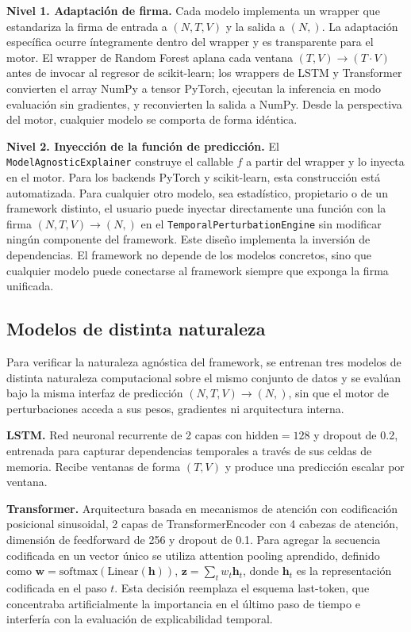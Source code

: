 \documentclass[conference, letterpaper]{IEEEtran}
\begin{document}
\textbf{Nivel 1. Adaptación de firma.} Cada modelo implementa
un wrapper que estandariza la firma de entrada a $(N, T, V)$ y
la salida a $(N,)$. La adaptación específica ocurre íntegramente
dentro del wrapper y es transparente para el motor. El wrapper de
Random Forest aplana cada ventana $(T, V) \rightarrow (T \cdot V)$
antes de invocar al regresor de scikit-learn; los wrappers de LSTM
y Transformer convierten el array NumPy a tensor PyTorch, ejecutan
la inferencia en modo evaluación sin gradientes, y reconvierten la
salida a NumPy. Desde la perspectiva del motor, cualquier modelo
se comporta de forma idéntica.

\textbf{Nivel 2. Inyección de la función de predicción.} El
\texttt{ModelAgnosticExplainer} construye el callable $f$ a partir
del wrapper y lo inyecta en el motor. Para los backends PyTorch y
scikit-learn, esta construcción está automatizada. Para cualquier
otro modelo, sea estadístico, propietario o de un framework distinto,
el usuario puede inyectar directamente una función con la firma
$(N, T, V) \rightarrow (N,)$ en el \texttt{TemporalPerturbationEngine}
sin modificar ningún componente del framework. Este diseño implementa
la inversión de dependencias. El framework no depende de los modelos
concretos, sino que cualquier modelo puede conectarse al framework
siempre que exponga la firma unificada.


\subsection{Modelos de distinta naturaleza}
\label{sec:modelos_naturaleza}

Para verificar la naturaleza agnóstica del framework, se
entrenan tres modelos de distinta naturaleza computacional
sobre el mismo conjunto de datos y se evalúan bajo la misma
interfaz de predicción $(N, T, V) \rightarrow (N,)$, sin que
el motor de perturbaciones acceda a sus pesos, gradientes ni
arquitectura interna.

\textbf{LSTM.} Red neuronal recurrente de 2 capas con
$\text{hidden}=128$ y dropout de 0.2, entrenada para capturar
dependencias temporales a través de sus celdas de memoria.
Recibe ventanas de forma $(T, V)$ y produce una predicción
escalar por ventana.

\textbf{Transformer.} Arquitectura basada en mecanismos de
atención con codificación posicional sinusoidal, 2 capas de
TransformerEncoder con 4 cabezas de atención, dimensión de
feedforward de 256 y dropout de 0.1. Para agregar la secuencia
codificada en un vector único se utiliza attention pooling
aprendido, definido como $\mathbf{w} = \text{softmax}(\text{Linear}(\mathbf{h}))$,
$\mathbf{z} = \sum_t w_t \mathbf{h}_t$, donde $\mathbf{h}_t$ es
la representación codificada en el paso $t$. Esta decisión
reemplaza el esquema last-token, que concentraba artificialmente
la importancia en el último paso de tiempo e interfería con la
evaluación de explicabilidad temporal.
\end{document}
